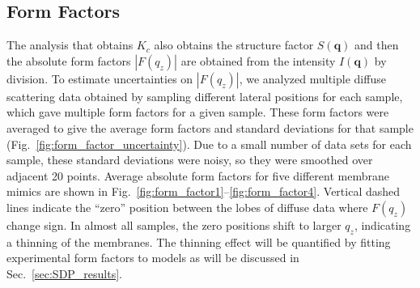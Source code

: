 \subsection{Form Factors}\label{sec:form_factors_results}
The analysis that obtains $K_c$ also obtains the structure factor $S(\mathbf{q})$ 
and then the absolute form factors $|F(q_z)|$ are obtained from the intensity 
$I(\mathbf{q})$ by division. 
To estimate uncertainties on $|F(q_z)|$, we analyzed multiple diffuse 
scattering data obtained by sampling different lateral positions for each sample,
which gave multiple form factors for a given sample.
These form factors were averaged to give the average form factors
and standard deviations for that sample (Fig.~\ref{fig:form_factor_uncertainty}).
Due to a small number of data sets for each sample, these standard
deviations were noisy, so they were smoothed over adjacent 20 points.
Average absolute form factors for five different membrane mimics are shown in 
Fig.~\ref{fig:form_factor1}--\ref{fig:form_factor4}. 
Vertical dashed lines indicate the ``zero'' position between the lobes of diffuse data 
where $F(q_z)$ change sign. In almost all samples, the zero positions shift to larger
$q_z$, indicating a thinning of the membranes. The thinning effect will be
quantified by fitting experimental form factors to models as will be discussed in
Sec.~\ref{sec:SDP_results}.

